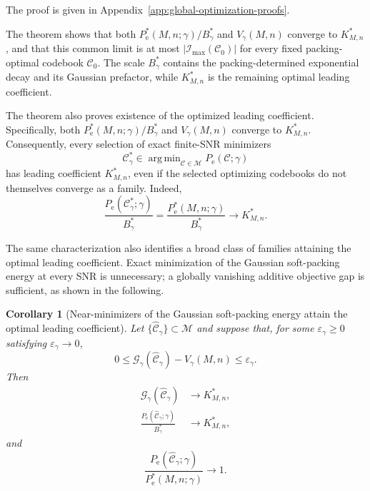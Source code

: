 \documentclass[12pt,draftclsnofoot,onecolumn]{IEEEtran}
\DeclareMathOperator*{\argmin}{arg\,min}
\newcommand{\cC}{\mathcal{C}}
\newcommand{\cG}{\mathcal{G}}
\newcommand{\cI}{\mathcal{I}}
\newcommand{\cM}{\mathcal{M}}
\newcommand{\Pe}{P_{\mathrm e}}
\newcommand{\eps}{\varepsilon}
\newtheorem{corollary}{Corollary}
\theoremstyle{definition}
\begin{document}
\begin{IEEEproof}
The proof is given in
Appendix~\ref{app:global-optimization-proofs}.
\end{IEEEproof}

The theorem shows that both
\(\Pe^{\ast}(M,n;\gamma)/B_\gamma^{\ast}\) and \(V_\gamma(M,n)\)
converge to \(K^{\ast}_{M,n}\), and that this common limit is at most
\(\lvert\cI_{\max}(\cC_0)\rvert\) for every fixed packing-optimal
codebook \(\cC_0\).  The scale \(B_\gamma^{\ast}\) contains the
packing-determined exponential decay and its Gaussian prefactor, while
\(K^{\ast}_{M,n}\) is the remaining optimal leading coefficient.

The theorem also proves existence of the optimized
leading coefficient. Specifically, both
\(\Pe^{\ast}(M,n;\gamma)/B_\gamma^{\ast}\) and \(V_\gamma(M,n)\)
converge to \(K^{\ast}_{M,n}\).  Consequently, every selection of exact
finite-SNR minimizers
\[
  \cC_\gamma^{\ast}
  \in\argmin_{\cC\in\cM}\Pe(\cC;\gamma)
\]
has leading coefficient \(K^{\ast}_{M,n}\), even if the selected
optimizing codebooks do not themselves converge as a family.  Indeed,
\[
  \frac{\Pe(\cC_\gamma^{\ast};\gamma)}{B_\gamma^{\ast}}
  =
  \frac{\Pe^{\ast}(M,n;\gamma)}{B_\gamma^{\ast}}
  \longrightarrow K^{\ast}_{M,n}.
\]
 

The same characterization also identifies a broad class of
families attaining the optimal leading coefficient.  Exact minimization of the Gaussian
soft-packing energy at every SNR is unnecessary; a globally vanishing
additive objective gap is sufficient, as shown in the following.

\begin{corollary}[Near-minimizers of the Gaussian soft-packing energy attain the optimal leading coefficient]
\label{cor:soft-energy-minimizers-attain}
Let \(\{\widehat{\cC}_\gamma\}\subset\cM\) and suppose that, for some
\(\eps_\gamma\ge0\) satisfying \(\eps_\gamma\to0\),
\begin{equation}
  0\le
  \cG_\gamma(\widehat{\cC}_\gamma)-V_\gamma(M,n)
  \le\eps_\gamma.
  \label{eq:soft-energy-near-minimizer-gap}
\end{equation}
Then
\begin{equation}
\begin{aligned}
  \cG_\gamma(\widehat{\cC}_\gamma)
  &\longrightarrow K^{\ast}_{M,n},\\
  \frac{\Pe(\widehat{\cC}_\gamma;\gamma)}{B_\gamma^{\ast}}
  &\longrightarrow K^{\ast}_{M,n},
\end{aligned}
  \label{eq:soft-energy-minimizers-attain-Kstar}
\end{equation}
and
\begin{equation}
  \frac{\Pe(\widehat{\cC}_\gamma;\gamma)}
  {\Pe^{\ast}(M,n;\gamma)}\longrightarrow1.
  \label{eq:soft-energy-near-minimizer-relative-attainment}
\end{equation}
\end{corollary}
\end{document}
